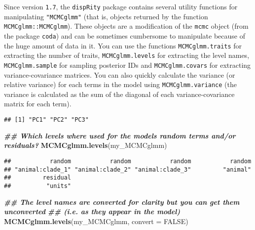 \documentclass[
]{book}
\newenvironment{Shaded}{\begin{snugshade}}{\end{snugshade}}
\newcommand{\AttributeTok}[1]{\textcolor[rgb]{0.13,0.29,0.53}{#1}}
\newcommand{\ConstantTok}[1]{\textcolor[rgb]{0.56,0.35,0.01}{#1}}
\newcommand{\DocumentationTok}[1]{\textcolor[rgb]{0.56,0.35,0.01}{\textbf{\textit{#1}}}}
\newcommand{\FunctionTok}[1]{\textcolor[rgb]{0.13,0.29,0.53}{\textbf{#1}}}
\newcommand{\NormalTok}[1]{#1}
\newcommand{\OtherTok}[1]{\textcolor[rgb]{0.56,0.35,0.01}{#1}}
\newcommand{\SpecialCharTok}[1]{\textcolor[rgb]{0.81,0.36,0.00}{\textbf{#1}}}
\begin{document}
Since version \texttt{1.7}, the \texttt{dispRity} package contains several utility functions for manipulating \texttt{"MCMCglmm"} (that is, objects returned by the function \texttt{MCMCglmm::MCMCglmm}).
These objects are a modification of the \texttt{mcmc} object (from the package \texttt{coda}) and can be sometimes cumbersome to manipulate because of the huge amount of data in it.
You can use the functions \texttt{MCMCglmm.traits} for extracting the number of traits, \texttt{MCMCglmm.levels} for extracting the level names, \texttt{MCMCglmm.sample} for sampling posterior IDs and \texttt{MCMCglmm.covars} for extracting variance-covariance matrices. You can also quickly calculate the variance (or relative variance) for each terms in the model using \texttt{MCMCglmm.variance} (the variance is calculated as the sum of the diagonal of each variance-covariance matrix for each term).

\begin{Shaded}
\end{Shaded}

\begin{verbatim}
## [1] "PC1" "PC2" "PC3"
\end{verbatim}

\begin{Shaded}
\begin{Highlighting}[]
\DocumentationTok{\#\# Which levels where used for the model\textquotesingle{}s random terms and/or residuals?}
\FunctionTok{MCMCglmm.levels}\NormalTok{(my\_MCMCglmm)}
\end{Highlighting}
\end{Shaded}

\begin{verbatim}
##           random           random           random           random 
## "animal:clade_1" "animal:clade_2" "animal:clade_3"         "animal" 
##         residual 
##          "units"
\end{verbatim}

\begin{Shaded}
\begin{Highlighting}[]
\DocumentationTok{\#\# The level names are converted for clarity but you can get them unconverted}
\DocumentationTok{\#\# (i.e. as they appear in the model)}
\FunctionTok{MCMCglmm.levels}\NormalTok{(my\_MCMCglmm, }\AttributeTok{convert =} \ConstantTok{FALSE}\NormalTok{)}
\end{Highlighting}
\end{Shaded}
\end{document}
